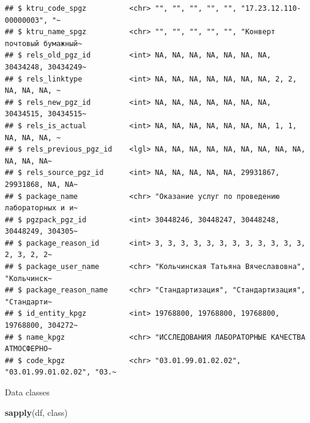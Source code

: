 \documentclass[
]{article}
\newenvironment{Shaded}{\begin{snugshade}}{\end{snugshade}}
\newcommand{\FunctionTok}[1]{\textcolor[rgb]{0.13,0.29,0.53}{\textbf{#1}}}
\newcommand{\NormalTok}[1]{#1}
\begin{document}
\begin{verbatim}
## $ ktru_code_spgz          <chr> "", "", "", "", "", "17.23.12.110-00000003", "~
## $ ktru_name_spgz          <chr> "", "", "", "", "", "Конверт почтовый бумажный~
## $ rels_old_pgz_id         <int> NA, NA, NA, NA, NA, NA, NA, 30434248, 30434249~
## $ rels_linktype           <int> NA, NA, NA, NA, NA, NA, NA, 2, 2, NA, NA, NA, ~
## $ rels_new_pgz_id         <int> NA, NA, NA, NA, NA, NA, NA, 30434515, 30434515~
## $ rels_is_actual          <int> NA, NA, NA, NA, NA, NA, NA, 1, 1, NA, NA, NA, ~
## $ rels_previous_pgz_id    <lgl> NA, NA, NA, NA, NA, NA, NA, NA, NA, NA, NA, NA~
## $ rels_source_pgz_id      <int> NA, NA, NA, NA, NA, 29931867, 29931868, NA, NA~
## $ package_name            <chr> "Оказание услуг по проведению лабораторных и и~
## $ pgzpack_pgz_id          <int> 30448246, 30448247, 30448248, 30448249, 304305~
## $ package_reason_id       <int> 3, 3, 3, 3, 3, 3, 3, 3, 3, 3, 3, 3, 2, 3, 2, 2~
## $ package_user_name       <chr> "Кольчинская Татьяна Вячеславовна", "Кольчинск~
## $ package_reason_name     <chr> "Стандартизация", "Стандартизация", "Стандарти~
## $ id_entity_kpgz          <int> 19768800, 19768800, 19768800, 19768800, 304272~
## $ name_kpgz               <chr> "ИССЛЕДОВАНИЯ ЛАБОРАТОРНЫЕ КАЧЕСТВА АТМОСФЕРНО~
## $ code_kpgz               <chr> "03.01.99.01.02.02", "03.01.99.01.02.02", "03.~
\end{verbatim}

Data classes

\begin{Shaded}
\begin{Highlighting}[]
\FunctionTok{sapply}\NormalTok{(df, class)}
\end{Highlighting}
\end{Shaded}
\end{document}
